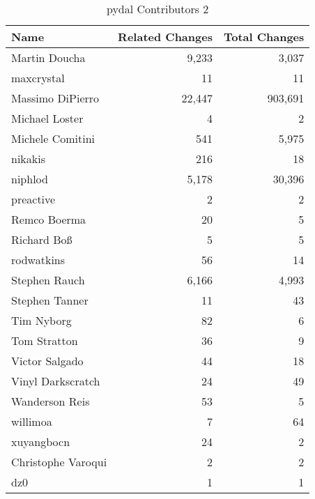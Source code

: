 \documentclass[a4paper,man,natbib,floatsintext]{apa6}
\begin{document}
\begin{table}[ht]
\caption{pydal Contributors 2}
\label{tab:contribs-2.2}
\begin{tabular}{|l|r|r|}
\hline
Name                 & Related Changes & Total Changes \\ \hline
Martin Doucha        & 9,233           & 3,037         \\ \hline
maxcrystal           & 11              & 11            \\ \hline
Massimo DiPierro     & 22,447          & 903,691       \\ \hline
Michael Loster       & 4               & 2             \\ \hline
Michele Comitini     & 541             & 5,975         \\ \hline
nikakis              & 216             & 18            \\ \hline
niphlod              & 5,178           & 30,396        \\ \hline
preactive            & 2               & 2             \\ \hline
Remco Boerma         & 20              & 5             \\ \hline
Richard Boß          & 5               & 5             \\ \hline
rodwatkins           & 56              & 14            \\ \hline
Stephen Rauch        & 6,166           & 4,993         \\ \hline
Stephen Tanner       & 11              & 43            \\ \hline
Tim Nyborg           & 82              & 6             \\ \hline
Tom Stratton         & 36              & 9             \\ \hline
Victor Salgado       & 44              & 18            \\ \hline
Vinyl Darkscratch    & 24              & 49            \\ \hline
Wanderson Reis       & 53              & 5             \\ \hline
willimoa             & 7               & 64            \\ \hline
xuyangbocn           & 24              & 2             \\ \hline
Christophe Varoqui   & 2               & 2             \\ \hline
dz0                  & 1               & 1             \\ \hline
\end{tabular}
\end{table}
\end{document}
